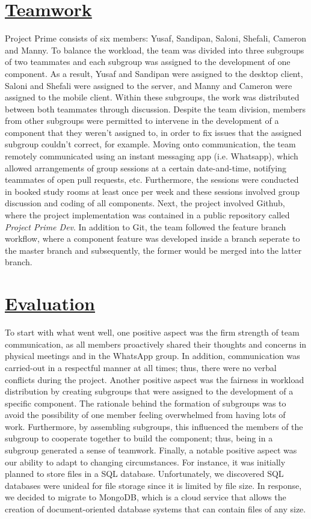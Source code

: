 \documentclass{article}
\begin{document}
\section{\underline{Teamwork}}
Project Prime consists of six members: Yusaf, Sandipan, Saloni, Shefali, Cameron and Manny. To balance the workload, the team was divided into three subgroups of two teammates and each subgroup was assigned to the development of one component. As a result, Yusaf and Sandipan were assigned to the desktop client, Saloni and Shefali were assigned to the server, and Manny and Cameron were assigned to the mobile client. Within these subgroups, the work was distributed between both teammates through discussion. Despite the team division, members from other subgroups were permitted to intervene in the development of a component that they weren't assigned to, in order to fix issues that the assigned subgroup couldn't correct, for example. Moving onto communication, the team remotely communicated using an instant messaging app (i.e. Whatsapp), which allowed arrangements of group sessions at a certain date-and-time, notifying teammates of open pull requests, etc. Furthermore, the sessions were conducted in booked study rooms at least once per week and these sessions involved group discussion and coding of all components. Next, the project involved Github, where the project implementation was contained in a public repository called \textit{Project Prime Dev}. In addition to Git, the team followed the feature branch workflow, where a component feature was developed inside a branch seperate to the master branch and subsequently, the former would be merged into the latter branch.

\section{\underline{Evaluation}}
To start with what went well, one positive aspect was the firm strength of team communication, as all members proactively shared their thoughts and concerns in physical meetings and in the WhatsApp group. In addition, communication was carried-out in a respectful manner at all times; thus, there were no verbal conflicts during the project. Another positive aspect was the fairness in workload distribution by creating subgroups that were assigned to the development of a specific component. The rationale behind the formation of subgroups was to avoid the possibility of one member feeling overwhelmed from having lots of work. Furthermore, by assembling subgroups, this influenced the members of the subgroup to cooperate together to build the component; thus, being in a subgroup generated a sense of teamwork. Finally, a notable positive aspect was our ability to adapt to changing circumstances. For instance, it was initially planned to store files in a SQL database. Unfortunately, we discovered SQL databases were unideal for file storage since it is limited by file size. In response, we decided to migrate to MongoDB, which is a cloud service that allows the creation of document-oriented database systems that can contain files of any size.
\end{document}
